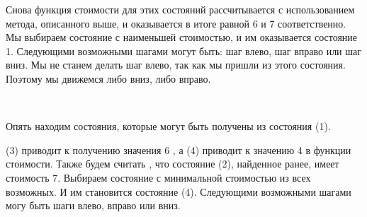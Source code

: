 \begin{tcolorbox}
\end{tcolorbox}

Снова функция стоимости для этих состояний рассчитывается с использованием метода, описанного выше, и оказывается в итоге равной 6 и 7 соответственно. Мы выбираем состояние с наименьшей стоимостью, и им оказывается состояние 1. Следующими возможными шагами могут быть: шаг влево, шаг вправо или шаг вниз. Мы не станем делать шаг влево, так как мы пришли из этого состояния. Поэтому мы движемся либо вниз, либо вправо.

~

Опять находим состояния, которые могут быть получены из состояния (1).

\begin{tcolorbox}
\end{tcolorbox}

(3) приводит к получению значения 6 , а (4) приводит к значению 4 в функции стоимости. Также будем считать , что состояние (2), найденное ранее, имеет стоимость 7. Выбираем состояние с минимальной стоимостью из всех возможных. И им становится состояние (4). Следующими возможными шагами могу быть шаги влево, вправо или вниз.

